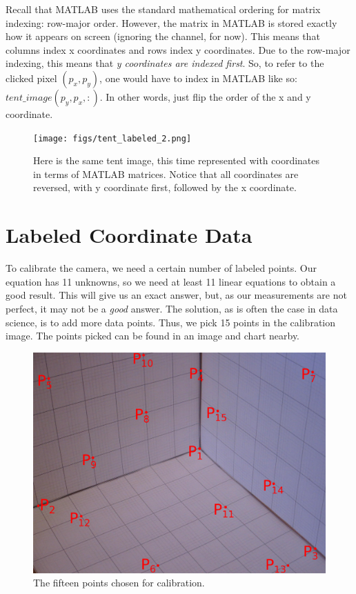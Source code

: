 \documentclass{article}
\begin{document}
Recall that MATLAB uses the standard mathematical ordering for matrix indexing: 
row-major order. However, the matrix in MATLAB is stored exactly how it appears 
on screen (ignoring the channel, for now). This means that columns index x 
coordinates and rows index y coordinates. Due to the row-major indexing, this 
means that \textit{y coordinates are indexed first}. So, to refer to the clicked 
pixel $(p_x, p_y)$, one would have to index in MATLAB like so: $tent\_image(p_y, p_x, :)$. 
In other words, just flip the order of the x and y coordinate.

\begin{figure}[!ht]
	\centering
	\texttt{[image: figs/tent\_labeled\_2.png]}
	\caption{Here is the same tent image, this time represented with coordinates 
        in terms of MATLAB matrices. Notice that all coordinates are reversed, 
        with y coordinate first, followed by the x coordinate.}
\end{figure}

\section{Labeled Coordinate Data}

To calibrate the camera, we need a certain number of labeled points. Our 
equation has 11 unknowns, so we need at least 11 linear equations to obtain a 
good result. This will give us an exact answer, but, as our measurements are not 
perfect, it may not be a \textit{good} answer. The solution, as is often the 
case in data science, is to add more data points. Thus, we pick 15 points in the 
calibration image. The points picked can be found in an image and chart nearby.

\begin{figure}[!ht]
	\centering
	\includegraphics[width=120mm]{figs/calibration_labeled.png}
	\caption{The fifteen points chosen for calibration.}
\end{figure}
\end{document}
